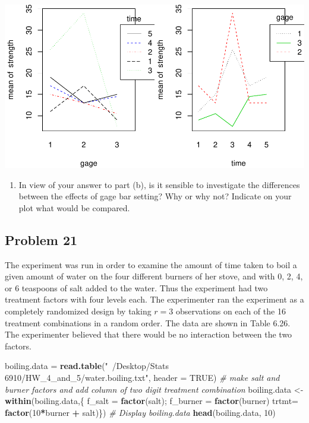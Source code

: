 \documentclass[12pt,]{article}
\newenvironment{Shaded}{\begin{snugshade}}{\end{snugshade}}
\newcommand{\KeywordTok}[1]{\textcolor[rgb]{0.13,0.29,0.53}{\textbf{#1}}}
\newcommand{\DataTypeTok}[1]{\textcolor[rgb]{0.13,0.29,0.53}{#1}}
\newcommand{\DecValTok}[1]{\textcolor[rgb]{0.00,0.00,0.81}{#1}}
\newcommand{\StringTok}[1]{\textcolor[rgb]{0.31,0.60,0.02}{#1}}
\newcommand{\CommentTok}[1]{\textcolor[rgb]{0.56,0.35,0.01}{\textit{#1}}}
\newcommand{\OtherTok}[1]{\textcolor[rgb]{0.56,0.35,0.01}{#1}}
\newcommand{\OperatorTok}[1]{\textcolor[rgb]{0.81,0.36,0.00}{\textbf{#1}}}
\newcommand{\NormalTok}[1]{#1}
\providecommand{\tightlist}{%
  \setlength{\itemsep}{0pt}\setlength{\parskip}{0pt}}
\begin{document}
\includegraphics{Markdown_HW_6_files/figure-latex/unnamed-chunk-7-1.pdf}

\begin{enumerate}
\def\labelenumi{(\alph{enumi})}
\setcounter{enumi}{2}
\tightlist
\item
  In view of your answer to part (b), is it sensible to investigate the
  differences between the effects of gage bar setting? Why or why not?
  Indicate on your plot what would be compared.
\end{enumerate}

\subsection{Problem 21}\label{problem-21}

The experiment was run in order to examine the amount of time taken to
boil a given amount of water on the four different burners of her stove,
and with 0, 2, 4, or 6 teaspoons of salt added to the water. Thus the
experiment had two treatment factors with four levels each. The
experimenter ran the experiment as a completely randomized design by
taking \(r = 3\) observations on each of the 16 treatment combinations
in a random order. The data are shown in Table 6.26. The experimenter
believed that there would be no interaction between the two factors.

\begin{Shaded}
\begin{Highlighting}[]
\NormalTok{boiling.data =}\StringTok{ }\KeywordTok{read.table}\NormalTok{(}\StringTok{"~/Desktop/Stats 6910/HW_4_and_5/water.boiling.txt"}\NormalTok{, }
                            \DataTypeTok{header =} \OtherTok{TRUE}\NormalTok{)}
\CommentTok{# make salt and burner factors and add column of two digit treatment combination}
\NormalTok{boiling.data <-}\StringTok{ }\KeywordTok{within}\NormalTok{(boiling.data,\{}
\NormalTok{   f_salt =}\StringTok{ }\KeywordTok{factor}\NormalTok{(salt); f_burner =}\StringTok{ }\KeywordTok{factor}\NormalTok{(burner)}
\NormalTok{   trtmt=}\StringTok{ }\KeywordTok{factor}\NormalTok{(}\DecValTok{10}\OperatorTok{*}\NormalTok{burner }\OperatorTok{+}\StringTok{ }\NormalTok{salt)\})}
\CommentTok{# Display boiling.data}
\KeywordTok{head}\NormalTok{(boiling.data, }\DecValTok{10}\NormalTok{)}
\end{Highlighting}
\end{Shaded}
\end{document}
